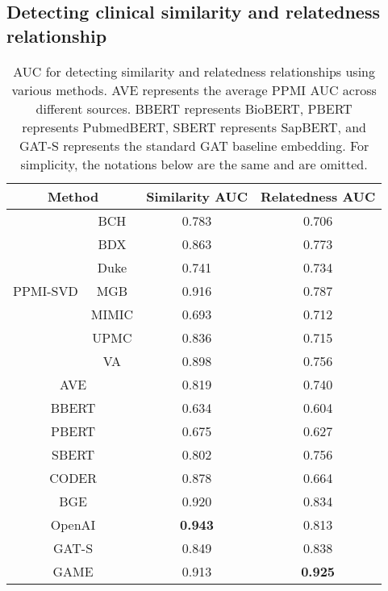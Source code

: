 \documentclass{article}
\begin{document}
\subsection{Detecting clinical similarity and relatedness relationship}
\begin{table}[H]
\centering
\begin{tabular}{cc|cc}
\hline
\multicolumn{2}{c}{\textbf{Method}} & \textbf{Similarity AUC} & \textbf{Relatedness AUC} \\ \hline 
\multirow{7}{*}{PPMI-SVD} 
 & BCH & 0.783 & 0.706 \\ 
 & {BDX} & 0.863 & 0.773 \\ 
 & {Duke} & 0.741 & 0.734 \\
 & {MGB} & 0.916 & 0.787 \\ 
 & {MIMIC} & 0.693 & 0.712 \\ 
 & {UPMC} & 0.836 & 0.715 \\ 
 & {VA} & 0.898 & 0.756 \\
\multicolumn{2}{c|}{{AVE}} & 0.819 & 0.740 \\ \hline
\multicolumn{2}{c|}{{BBERT}} & 0.634 & 0.604 \\ 
\multicolumn{2}{c|}{{PBERT}} & 0.675 & 0.627 \\ 
\multicolumn{2}{c|}{{SBERT}} & 0.802 & 0.756 \\ 
\multicolumn{2}{c|}{{CODER}} & 0.878 & 0.664 \\  
\multicolumn{2}{c|}{{BGE}} & 0.920 & 0.834 \\ 
\multicolumn{2}{c|}{{OpenAI}} & \textbf{0.943} & 0.813 \\ 
\multicolumn{2}{c|}{{GAT-S}} & 0.849 & 0.838 \\ 
\multicolumn{2}{c|}{{GAME}} & 0.913 & \textbf{0.925} \\ \hline
\end{tabular}
\caption{AUC for detecting similarity and relatedness relationships using various methods. AVE represents the average PPMI AUC across different sources. BBERT represents BioBERT, PBERT represents PubmedBERT, SBERT represents SapBERT, and GAT-S represents the standard GAT baseline embedding. For simplicity, the notations below are the same and are omitted.}
\label{R2}
\end{table}
\end{document}
